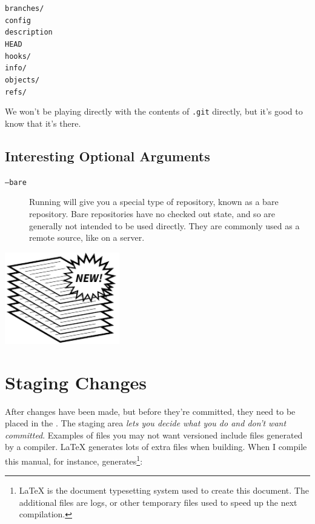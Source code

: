 \documentclass[11pt,letterpaper,twoside]{report}
\begin{document}
\begin{multicols}{4}
\noindent
\texttt{branches/}\\
\texttt{config}\\
\texttt{description}\\
\texttt{HEAD}\\
\texttt{hooks/}\\
\texttt{info/}\\
\texttt{objects/}\\
\texttt{refs/}
\end{multicols}

We won't be playing directly with the contents of \texttt{.git} directly, but
it's good to know that it's there.

\section{Interesting Optional Arguments}

\begin{description}
\item[\texttt{--bare}]
    Running  will give you a special type of repository,
    known as a bare repository. Bare repositories have no checked out state, and
    so are generally not intended to be used directly. They are commonly used as
    a remote source, like on a server.
\end{description}

\vspace{\fill}
\begin{flushright}
\includegraphics[height=4cm]{resources/new_stack_abstract.pdf}
\end{flushright}
\vspace*{\fill}

\chapter{Staging Changes}

After changes have been made, but before they're committed, they need to be
placed in the . The staging area \emph{lets you decide what
you do and don't want committed}. Examples of files you may not want
versioned include files generated by a compiler. \LaTeX{} generates lots of
extra files when building. When I compile this manual, for instance,
 generates\footnote{\LaTeX{} is the document typesetting system
used to create this document. The additional files are logs, or other temporary
files used to speed up the next compilation.}:
\end{document}
